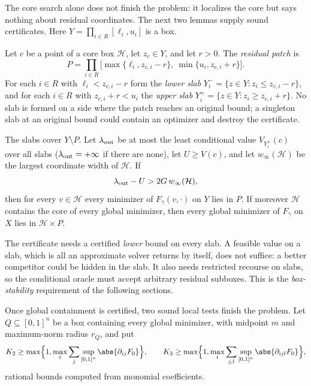 The core search alone does not finish the problem: it localizes the core but
says nothing about residual coordinates. The next two lemmas supply sound
certificates. Here $Y=\prod_{i\in R}[\ell_i,u_i]$ is a box.

Let $c$ be a point of a core box $\mathcal H$, let $z_c\in Y$, and let $r>0$.
The \emph{residual patch} is
\[
 P=\prod_{i\in R}\bigl[\max\{\ell_i,z_{c,i}-r\},\ \min\{u_i,z_{c,i}+r\}\bigr].
\]
For each $i\in R$ with $\ell_i<z_{c,i}-r$ form the \emph{lower slab}
$Y_i^-=\{z\in Y:z_i\le z_{c,i}-r\}$, and for each $i\in R$ with
$z_{c,i}+r<u_i$ the \emph{upper slab} $Y_i^+=\{z\in Y:z_i\ge z_{c,i}+r\}$.
No slab is formed on a side where the patch reaches an original bound; a
singleton slab at an original bound could contain an optimizer and destroy
the certificate.

\begin{lemma}\label{lem:rec:exclusion}
The slabs cover $Y\setminus P$. Let $\lambda_{\rm out}$ be at most the least
conditional value $V_{Y_i^\pm}(c)$ over all slabs ($\lambda_{\rm out}=+\infty$
if there are none), let $U\ge V(c)$, and let $w_\infty(\mathcal H)$ be the
largest coordinate width of $\mathcal H$. If
\begin{equation}\label{eq:rec:exclusion}
 \lambda_{\rm out}-U>2G\,w_\infty(\mathcal H),
\end{equation}
then for every $v\in\mathcal H$ every minimizer of $F_\gamma(v,\cdot)$ on $Y$
lies in $P$. If moreover $\mathcal H$ contains the core of every global
minimizer, then every global minimizer of $F_\gamma$ on $X$ lies in
$\mathcal H\times P$.
\end{lemma}

The certificate needs a certified \emph{lower} bound on every slab. A
feasible value on a slab, which is all an approximate solver returns by
itself, does not suffice: a better competitor could be hidden in the slab.
It also needs restricted recourse on slabs, so the conditional oracle must
accept arbitrary residual subboxes. This is the \emph{box-stability}
requirement of the following sections.

Once global containment is certified, two sound local tests finish the
problem. Let $Q\subseteq[0,1]^n$ be a box containing every global
minimizer, with midpoint $m$ and maximum-norm radius $r_Q$, and put
\begin{equation}\label{eq:rec:K}
 K_2\ge\max\Bigl\{1,\max_i\sum_j\sup_{[0,1]^n}\abs{\partial_{ij}F_0}\Bigr\},
 \qquad
 K_3\ge\max\Bigl\{1,\max_i\sum_{j,l}\sup_{[0,1]^n}\abs{\partial_{ijl}F_0}\Bigr\},
\end{equation}
rational bounds computed from monomial coefficients.

